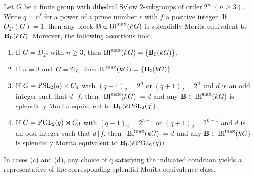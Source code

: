 \begin{prop}\label{prop:ClassificBlocksDihedralDefectGroupsMaxDefectO_2prime_is_1}%
Let $G$ be a finite group with dihedral Sylow $2$-subgroups of order $2^n$ $(n\geq 3)$. Write $q = r^f$ for a power of a prime number $r$ with $f$ a positive
integer. If $O_{2'}(G)=1$, then any block ${\mathbf{B}}\in\operatorname{Bl}^{\mathrm{max}}(kG)$  is splendidly Morita equivalent to ${\mathbf{B}}_0(kG)$. 
Moreover, the following assertions hold.
    \begin{enumerate}[label={\rm(\alph*)}]
        \item If $G=D_{2^n}$ with $n\geq 3$, then $\operatorname{Bl}^{\mathrm{max}}(kG)=\{{\mathbf{B}}_0(kG)\}$.
        \item If $n=3$ and $G={\mathfrak{A}}_7$, then $\operatorname{Bl}^{\mathrm{max}}(kG)=\{{\mathbf{B}}_0(kG)\}$.
        \item If $G=\operatorname{PSL}_2(q)\rtimes C_d$ with $(q-1)_2=2^n$ or $(q+1)_2=2^n$ and $d$ is an odd integer such that $d\,|\,f$, 
        then $|\operatorname{Bl}^{\mathrm{max}}(kG)|=d$ and any  ${\mathbf{B}}\in\operatorname{Bl}^{\mathrm{max}}(kG)$ is splendidly Morita equivalent to ${\mathbf{B}}_0(k\!\operatorname{PSL}_2(q))$.
        \item If $G=\operatorname{PGL}_2(q)\rtimes C_d$ with $(q-1)_2=2^{n-1}$ or $(q+1)_2=2^{n-1}$ and $d$ is an odd integer such that $d\,|\,f$, 
        then $|\operatorname{Bl}^{\mathrm{max}}(kG)|=d$ and any  ${\mathbf{B}}\in\operatorname{Bl}^{\mathrm{max}}(kG)$ is splendidly Morita equivalent to ${\mathbf{B}}_0(k\!\operatorname{PGL}_2(q))$.
    \end{enumerate}
 In cases {\rm(c)} and {\rm(d)}, any choice of q satisfying the indicated condition yields a representative of the corresponding splendid Morita equivalence class.      
\end{prop}

